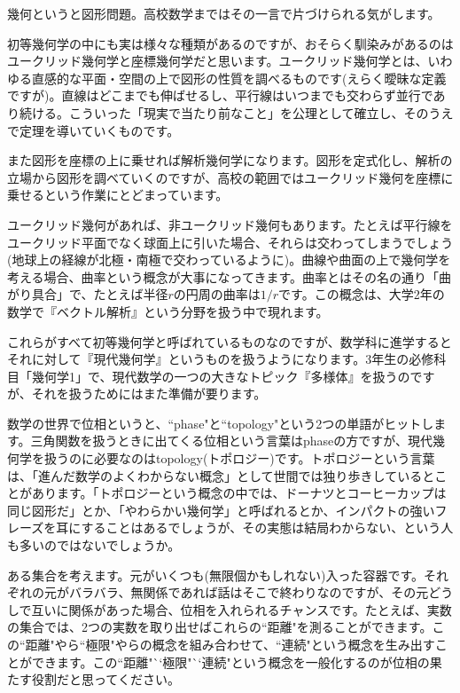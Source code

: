幾何というと図形問題。高校数学まではその一言で片づけられる気がします。

初等幾何学の中にも実は様々な種類があるのですが、おそらく馴染みがあるのはユークリッド幾何学と座標幾何学だと思います。ユークリッド幾何学とは、いわゆる直感的な平面・空間の上で図形の性質を調べるものです(えらく曖昧な定義ですが)。直線はどこまでも伸ばせるし、平行線はいつまでも交わらず並行であり続ける。こういった「現実で当たり前なこと」を公理として確立し、そのうえで定理を導いていくものです。

また図形を座標の上に乗せれば解析幾何学になります。図形を定式化し、解析の立場から図形を調べていくのですが、高校の範囲ではユークリッド幾何を座標に乗せるという作業にとどまっています。

ユークリッド幾何があれば、非ユークリッド幾何もあります。たとえば平行線をユークリッド平面でなく球面上に引いた場合、それらは交わってしまうでしょう(地球上の経線が北極・南極で交わっているように)。曲線や曲面の上で幾何学を考える場合、曲率という概念が大事になってきます。曲率とはその名の通り「曲がり具合」で、たとえば半径$r$の円周の曲率は$1/r$です。この概念は、大学2年の数学で『ベクトル解析』という分野を扱う中で現れます。

これらがすべて初等幾何学と呼ばれているものなのですが、数学科に進学するとそれに対して『現代幾何学』というものを扱うようになります。3年生の必修科目「幾何学1」で、現代数学の一つの大きなトピック『多様体』を扱うのですが、それを扱うためにはまた準備が要ります。


数学の世界で位相というと、``phase"と``topology"という2つの単語がヒットします。三角関数を扱うときに出てくる位相という言葉はphaseの方ですが、現代幾何学を扱うのに必要なのはtopology(トポロジー)です。トポロジーという言葉は、「進んだ数学のよくわからない概念」として世間では独り歩きしているとことがあります。「トポロジーという概念の中では、ドーナツとコーヒーカップは同じ図形だ」とか、「やわらかい幾何学」と呼ばれるとか、インパクトの強いフレーズを耳にすることはあるでしょうが、その実態は結局わからない、という人も多いのではないでしょうか。

ある集合を考えます。元がいくつも(無限個かもしれない)入った容器です。それぞれの元がバラバラ、無関係であれば話はそこで終わりなのですが、その元どうしで互いに関係があった場合、位相を入れられるチャンスです。たとえば、実数の集合では、2つの実数を取り出せばこれらの``距離"を測ることができます。この``距離"やら``極限"やらの概念を組み合わせて、``連続"という概念を生み出すことができます。この``距離"``極限"``連続"という概念を一般化するのが位相の果たす役割だと思ってください。

